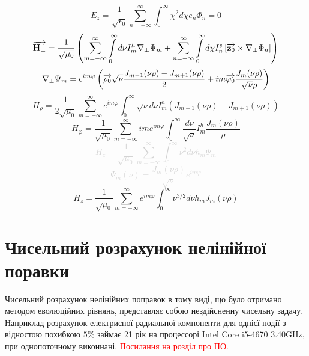 %
\begin{equation*} 
E_z = \frac{1}{\sqrt{\epsilon_0}} \sum_{n=-\infty}^{\infty}
\int_0^\infty \chi^2 d \chi e_n \Phi_n = 0
\end{equation*}
%
\textcolor{lightgray} { \begin{equation*}
\overrightarrow{\mathbf H_\perp} = \frac{1}{\sqrt{\mu_0}} \left( 
\sum \limits_{m=-\infty}^{\infty} \int \limits_{0}^{\infty} d \nu
I_m^h \nabla_\perp \Psi_m + \sum \limits_{n=-\infty}^{\infty}
\int \limits_{0}^{\infty} d \chi I_n^e 
\left[ \overrightarrow{\mathbf z_0} \times \nabla_\perp \Phi_n \right] \right)
\end{equation*} }
%
\textcolor{lightgray} { \begin{equation*} \begin{aligned}
\nabla_\perp \Psi_m = e^{i m \varphi} \left( \overrightarrow{\mathbf \rho_0} 
\sqrt{\nu} \frac{ J_{m-1}(\nu \rho) - J_{m+1}(\nu \rho) }{2} +
i m \overrightarrow{\mathbf \varphi_0} \frac{J_m(\nu \rho)}{\sqrt{\nu} \rho} \right)
\end{aligned} \end{equation*} }
%
\begin{equation*}
H_\rho = \frac{1}{2 \sqrt{\mu_0}} \sum_{m=-\infty}^{\infty} 
e^{im\varphi} \int_{0}^{\infty} \sqrt{\nu} d \nu
I_m^h \left( J_{m-1}(\nu \rho) - J_{m+1}(\nu \rho) \right)
\end{equation*}
%
\begin{equation*}
H_\varphi = \frac{1}{\sqrt{\mu_0}} \sum_{m=-\infty}^{\infty} 
i m e^{im\varphi} \int_{0}^{\infty} \frac{d \nu}{\sqrt{\nu}}
I_m^h \frac{J_m(\nu \rho)}{\rho}
\end{equation*}
%
\textcolor{lightgray} { \begin{equation*} 
H_z = \frac{1}{\sqrt{\mu_0}} \sum_{m=-\infty}^{\infty}
\int_0^\infty \nu^2 d \nu h_m \Psi_m
\end{equation*} }
%
\textcolor{lightgray} { \begin{equation*} 
\Psi_m (\nu) = \frac{J_m(\nu \rho)}{\sqrt{\nu}} e^{i m \varphi}
\end{equation*} }
%
\begin{equation*} 
H_z = \frac{1}{\sqrt{\mu_0}} \sum_{m=-\infty}^{\infty}
e^{i m \varphi} \int_0^\infty \nu^{3/2} d \nu h_m 
J_m(\nu \rho)
\end{equation*}

\section{Чисельний розрахунок нелінійної поравки}
%
Чисельний розрахунок нелінійних поправок в тому виді, що було отримано методом 
еволюційних рівнянь, представляє собою нездійсненну чисельну задачу. Наприклад 
розрахунок електрисної радиальної компоненти для однієї події з відностою 
похибкою $ 5\% $ займає 21 рік на процессорі Intel Core i5-4670 3.40GHz, 
при однопоточному виконнані. \textcolor{red} { Посилання на розділ про ПО. }

